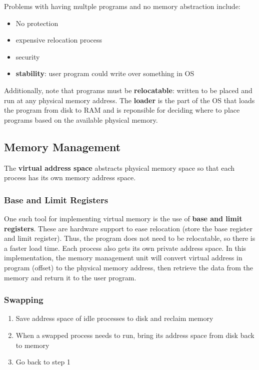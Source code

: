 \documentclass{article}
\newcommand{\bold}[1]{\textbf{#1}}
\renewcommand{\b}{\item[$\circ$]}
\newcommand{\newlist}{\begin{itemize}}
\renewcommand{\endlist}{\end{itemize}}
\begin{document}
Problems with having multple programs and no memory abstraction include:

\newlist 
\b No protection
\b expensive relocation process
\b security
\b \bold{stability}: user program could write over something in OS
\endlist

Additionally, note that programs must be \bold{relocatable}: written to be placed and run at any physical memory address. The \bold{loader} is the part of the OS that loads the program from disk to RAM and is reponsible for deciding where to place programs based on the available physical memory.  \\ 

\subsection{Memory Management}

The \bold{virtual address space} abstracts physical memory space so that each process has its own memory address space. \\ 

\subsubsection{Base and Limit Registers}

One such tool for implementing virtual memory is the use of \bold{base and limit registers}. These are hardware support to ease relocation (store the base register and limit register). Thus, the program does not need to be relocatable, so there is a faster load time. Each process also gets its own private address space. In this implementation, the memory management unit will convert virtual address in program (offset) to the physical memory address, then retrieve the data from the memory and return it to the user program. 

\subsubsection{Swapping}

\begin{enumerate}
    \item Save address space of idle processes to disk and reclaim memory
    \item When a swapped process needs to run, bring its address space from disk back to memory
    \item Go back to step 1
\end{enumerate}
\end{document}
